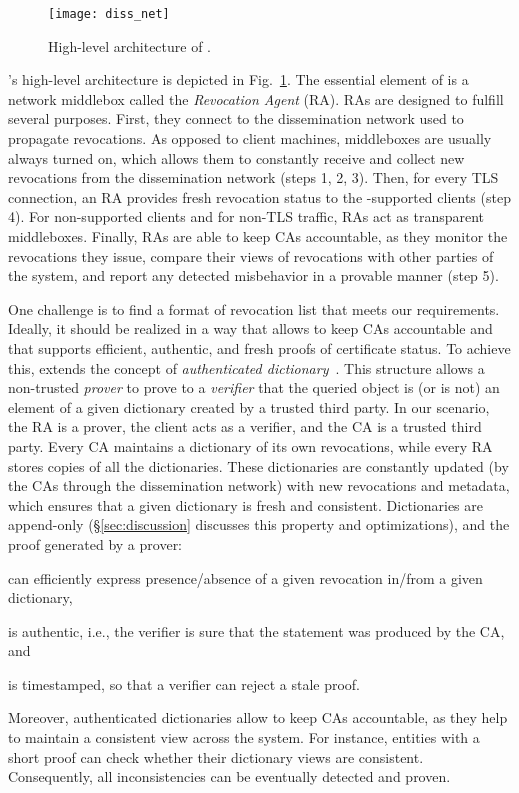 \begin{figure}[h!]
	\centering
    \texttt{[image: diss\_net]}
    \caption{High-level architecture of \name.}\label{fig:diss_net}
\end{figure}

\name's high-level architecture is depicted in Fig.~\ref{fig:diss_net}. The
essential element of \name is a network middlebox called the \textit{Revocation
Agent} (RA). RAs are designed to fulfill several purposes. First, they connect
to the dissemination network used to propagate revocations. As opposed to client
machines, middleboxes are usually always turned on, which allows them to
constantly receive and collect new revocations from the dissemination network
(steps 1, 2, 3). Then, for every TLS connection, an RA provides fresh revocation
status to the \name-supported clients (step 4). For non-supported clients and
for non-TLS traffic, RAs act as transparent middleboxes. Finally, RAs are able
to keep CAs accountable, as they monitor the revocations they issue, compare
their views of revocations with other parties of the system, and report any
detected misbehavior in a provable manner (step 5).

\label{sec:details:dict}
One challenge is to find a format of revocation list that meets our
requirements.  Ideally, it should be realized in a way that allows to keep CAs
accountable and that supports efficient, authentic, and fresh proofs of
certificate status.  To achieve this, \name extends the concept of
\textit{authenticated dictionary}~\cite{naor2000certificate}. This structure
allows a non-trusted \textit{prover} to prove to a \textit{verifier} that the
queried object is (or is not) an element of a given dictionary created by a
trusted third party. In our scenario, the RA is a prover, the client acts as a
verifier, and the CA is a trusted third party. Every CA maintains a dictionary
of its own revocations, while every RA stores copies of all the dictionaries.
These dictionaries are constantly updated (by the CAs through the dissemination
network) with new revocations and metadata, which ensures that a given
dictionary is fresh and consistent. Dictionaries are append-only
(\S\ref{sec:discussion} discusses this property and optimizations), and the
proof generated by a prover:
\begin{inparaenum}[\itshape 1)]
    \item can efficiently express presence/absence of a given revocation in/from
      a given dictionary,
    \item is authentic, i.e., the verifier is sure that the statement was
      produced by the CA, and
    \item is timestamped, so that a verifier can reject a stale proof.
\end{inparaenum}
Moreover, authenticated dictionaries allow to keep CAs accountable, as they help
to maintain a consistent view across the system. For instance, entities with a
short proof can check whether their dictionary views are consistent.
Consequently, all inconsistencies can be eventually detected and proven.

